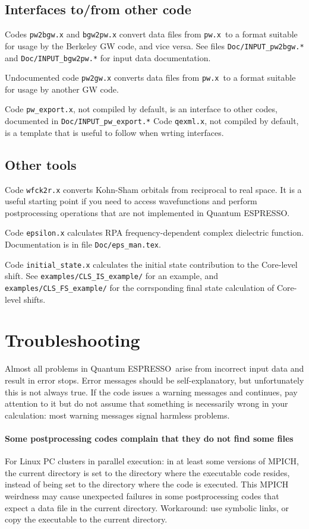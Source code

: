 \documentclass[12pt,a4paper]{article}
\def\qe{{\sc Quantum ESPRESSO}}
\def\pwx{\texttt{pw.x}}
\begin{document}
\subsection{Interfaces to/from other code}

Codes \texttt{pw2bgw.x} and \texttt{bgw2pw.x} convert data files from
\pwx\ to a format suitable for usage by the Berkeley GW code, and vice
versa. See files \texttt{Doc/INPUT\_pw2bgw.*} and \texttt{Doc/INPUT\_bgw2pw.*}
for input data documentation.

Undocumented code \texttt{pw2gw.x} converts data files from \pwx\ to
a format suitable for usage by another GW code.

Code \texttt{pw\_export.x}, not compiled by default, is an interface
to other codes, documented in \texttt{Doc/INPUT\_pw\_export.*}
Code \texttt{qexml.x}, not compiled by default, is a template that
is useful to follow when wrting interfaces.

\subsection{Other tools}

Code \texttt{wfck2r.x} converts Kohn-Sham orbitals from reciprocal to real 
space. It is a useful starting point if you need to access wavefunctions
and perform postprocessing operations that are not implemented in \qe.

Code \texttt{epsilon.x} calculates RPA frequency-dependent complex dielectric 
function. Documentation is in file \texttt{Doc/eps\_man.tex}.

Code \texttt{initial\_state.x} calculates the initial state contribution
to the Core-level shift. See \texttt{examples/CLS\_IS\_example/} for
an example, and \texttt{examples/CLS\_FS\_example/} for the corrsponding
final state calculation of Core-level shifts.

\section{Troubleshooting}

Almost all problems in \qe\ arise from incorrect input data and result in
error stops. Error messages should be self-explanatory, but unfortunately
this is not always true. If the code issues a warning messages and continues,
pay attention to it but do not assume that something is necessarily wrong in
your calculation: most warning messages signal harmless problems.

\paragraph{Some postprocessing codes complain that they do not find some files}
For Linux PC clusters in parallel execution: in at least some versions
of MPICH, the current directory is set to the directory where the executable
code resides, instead of being set to the directory where the code is executed.
This MPICH weirdness may cause unexpected failures in some postprocessing
codes that expect a data file in the current directory. Workaround: use
symbolic links, or copy the executable to the current directory.
\end{document}
